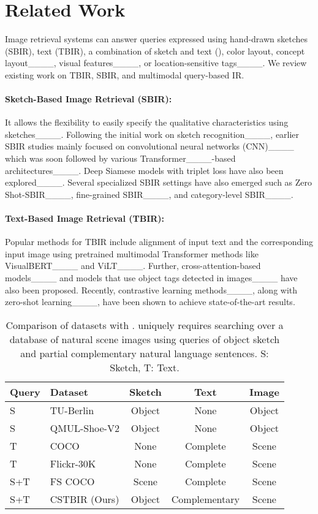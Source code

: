 \section{Related Work}
Image retrieval systems can answer queries expressed using hand-drawn sketches (SBIR), text (TBIR), a combination of sketch and text (\data{}), color layout, concept layout____, visual features____, or location-sensitive tags____. We review existing work on TBIR, SBIR, and multimodal query-based IR.

\paragraph{Sketch-Based Image Retrieval (SBIR):}
It allows the flexibility to easily specify the qualitative characteristics using sketches____. Following the initial work on sketch recognition____, earlier SBIR studies mainly focused on convolutional neural networks (CNN)____ which was soon followed by various Transformer____-based architectures____. Deep Siamese models with triplet loss have also been explored____. Several specialized SBIR settings have also emerged such as Zero Shot-SBIR____, fine-grained SBIR____, and category-level SBIR____.

\paragraph{Text-Based Image Retrieval (TBIR):}
Popular methods for TBIR include alignment of input text and the corresponding input image using pretrained multimodal Transformer methods like VisualBERT____ and ViLT____. Further, cross-attention-based models____ and models that use object tags detected in images____ have also been proposed. Recently, contrastive learning methods____, along with zero-shot learning____, have been shown to achieve state-of-the-art results. 


\begin{table}[!t]
\small
    \centering
    \begin{tabular}{|l|l|c|c|c|}
    \hline
     Query&Dataset&Sketch&Text&Image\\
      \hline
      \hline
S& TU-Berlin&Object&None&Object\\
S&QMUL-Shoe-V2&Object&None&Object\\
T&COCO&None&Complete&Scene\\
T&Flickr-30K&None&Complete&Scene\\
S+T&FS COCO&Scene&Complete&Scene\\
S+T&CSTBIR (Ours)&Object&Complementary&Scene\\
\hline
    \end{tabular}
    \caption{Comparison of datasets with \data{}. \data{} uniquely requires searching over a database of natural scene images using queries of object sketch and partial complementary natural language sentences. S: Sketch, T: Text.}
    \label{tab:datasetComparison}
\end{table}


